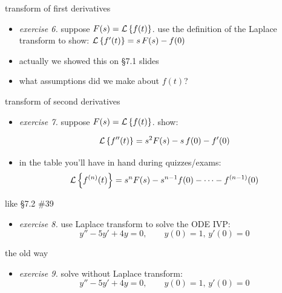 \documentclass[urlcolor=blue,dvipsnames]{beamer}
\begin{document}
\begin{frame}{transform of first derivatives}

\begin{itemize}
\item \emph{exercise 6.}  suppose $F(s) = \mathcal{L}\left\{f(t)\right\}$.  use the definition of the Laplace transform to show: \qquad $\mathcal{L}\left\{f'(t)\right\} = s\, F(s) - f(0)$

\vspace{40mm}
\footnotesize
\item actually we showed this on \S7.1 slides
\item what assumptions did we make about $f(t)$?
\end{itemize}
\end{frame}


\begin{frame}{transform of second derivatives}

\begin{itemize}
\item \emph{exercise 7.}  suppose $F(s) = \mathcal{L}\left\{f(t)\right\}$.  show:

$$\mathcal{L}\left\{f''(t)\right\} = s^2 F(s) - s\, f(0) - f'(0)$$

\vspace{40mm}
\footnotesize
\item in the table you'll have in hand during quizzes/exams:
   $$\mathcal{L}\left\{f^{(n)}(t)\right\} = s^n F(s) - s^{n-1} f(0) - \dots - f^{(n-1)}(0)$$
\end{itemize}
\end{frame}


\begin{frame}{like \S7.2 \#39}

\begin{itemize}
\item \emph{exercise 8.}  use Laplace transform to solve the ODE IVP:
    $$y''-5y'+4y=0, \qquad y(0)=1, \, y'(0)=0$$

\vspace{55mm}
\end{itemize}
\end{frame}


\begin{frame}{the old way}

\begin{itemize}
\item \emph{exercise 9.}  solve without Laplace transform:
    $$y''-5y'+4y=0, \qquad y(0)=1, \, y'(0)=0$$

\vspace{55mm}
\end{itemize}
\end{frame}
\end{document}
